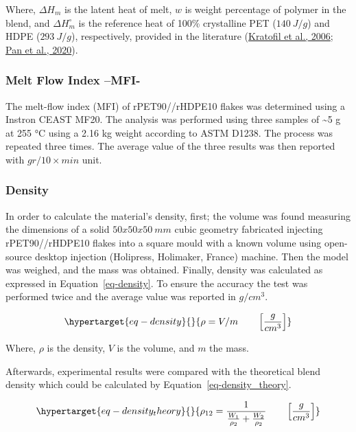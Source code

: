 \documentclass[
  12pt,
]{article}
\begin{document}
Where, \(\Delta H_{m}\) is the latent heat of melt, \(w\) is weight
percentage of polymer in the blend, and \(\Delta H_{m}^\circ\) is the
reference heat of 100\% crystalline PET (\(140~J/g\)) and HDPE
(\(293~J/g\)), respectively, provided in the literature
(\protect\hyperlink{ref-kratofil2006}{Kratofil et al., 2006};
\protect\hyperlink{ref-pan2020}{Pan et al., 2020}).

\hypertarget{melt-flow-index-mfi-}{%
\subsubsection{Melt Flow Index --MFI-}\label{melt-flow-index-mfi-}}

The melt-flow index (MFI) of rPET90//rHDPE10 flakes was determined using
a Instron CEAST MF20. The analysis was performed using three samples of
\textasciitilde5 g at 255 °C using a 2.16 kg weight according to ASTM
D1238. The process was repeated three times. The average value of the
three results was then reported with \(gr/10 \times min\) unit.

\hypertarget{density}{%
\subsubsection{Density}\label{density}}

In order to calculate the material's density, first; the volume was
found measuring the dimensions of a solid \(50x50x50~mm\) cubic geometry
fabricated injecting rPET90//rHDPE10 flakes into a square mould with a
known volume using open-source desktop injection (Holipress, Holimaker,
France) machine. Then the model was weighed, and the mass was obtained.
Finally, density was calculated as expressed in
Equation~\ref{eq-density}. To ensure the accuracy the test was performed
twice and the average value was reported in \(g/cm^{3}\).

\begin{equation}\protect\hypertarget{eq-density}{}{
\rho = V/m    \qquad \left[ \frac{g}{cm^{3}} \right]
}\label{eq-density}\end{equation}

Where, \(\rho\) is the density, \(V\) is the volume, and \(m\) the mass.

Afterwards, experimental results were compared with the theoretical
blend density which could be calculated by
Equation~\ref{eq-density_theory}.

\begin{equation}\protect\hypertarget{eq-density_theory}{}{
\rho_{12}= \frac{1}{\frac{W_{1}}{\rho_{2}} + \frac{W_{2}}{\rho_{2}}} \qquad \left[ \frac{g}{cm^{3}} \right]                                               
}\label{eq-density_theory}\end{equation}
\end{document}
